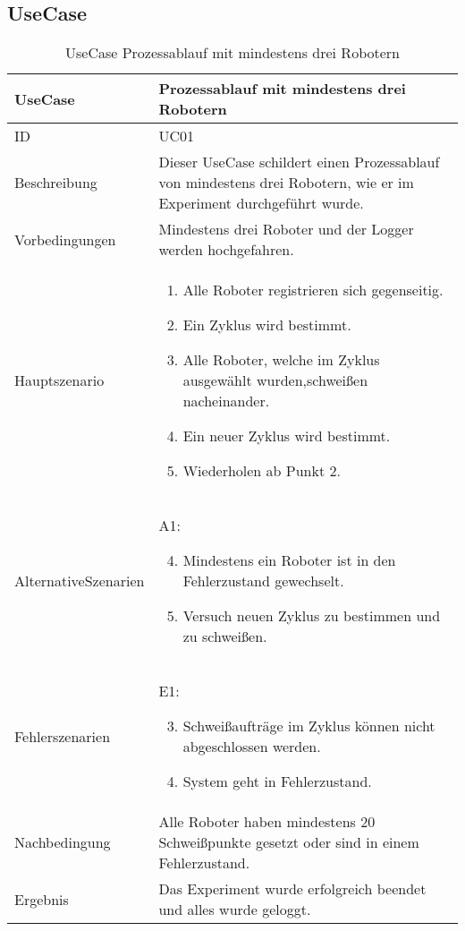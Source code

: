 \clearpage

\subsection{UseCase}
\begin{table}[h!]
\begin{center}
\begin{tabular}{ |p{2.8cm}|p{11cm}| } 
 \hline
 UseCase & Prozessablauf mit mindestens drei Robotern \\
 \hline
 ID & UC01 \\
 \hline
 Beschreibung & Dieser UseCase schildert einen Prozessablauf von mindestens drei Robotern, wie
 er im Experiment durchgeführt wurde. \\
 \hline
 Vorbedingungen & Mindestens drei Roboter und der Logger werden hochgefahren.\\
 \hline
 Hauptszenario & 
 \begin{enumerate}
  \item Alle Roboter registrieren sich gegenseitig.
  \item Ein Zyklus wird bestimmt.
  \item Alle Roboter, welche im Zyklus ausgewählt wurden,\newline schweißen nacheinander.
  \item Ein neuer Zyklus wird bestimmt.
  \item Wiederholen ab Punkt 2.
 \end{enumerate} \\
 \hline
 Alternative\newline Szenarien &
 A1: \newline
 \begin{enumerate}
  \setcounter{enumi}{3}
  \item Mindestens ein Roboter ist in den Fehlerzustand gewechselt.
  \item Versuch neuen Zyklus zu bestimmen und zu schweißen.
 \end{enumerate}  \\
 \hline
 Fehlerszenarien & 
 E1: \newline
 \begin{enumerate}
   \setcounter{enumi}{2}
   \item Schweißaufträge im Zyklus können nicht abgeschlossen werden.
   \item System geht in Fehlerzustand.
 \end{enumerate} \\
 \hline
 Nachbedingung & Alle Roboter haben mindestens 20 Schweißpunkte gesetzt oder sind in einem Fehlerzustand. \\
 \hline
 Ergebnis & Das Experiment wurde erfolgreich beendet und alles wurde geloggt. \\ 
 \hline
\end{tabular}
\caption{UseCase Prozessablauf mit mindestens drei Robotern}
\label{table:usecase1}
\end{center}
\end{table}
